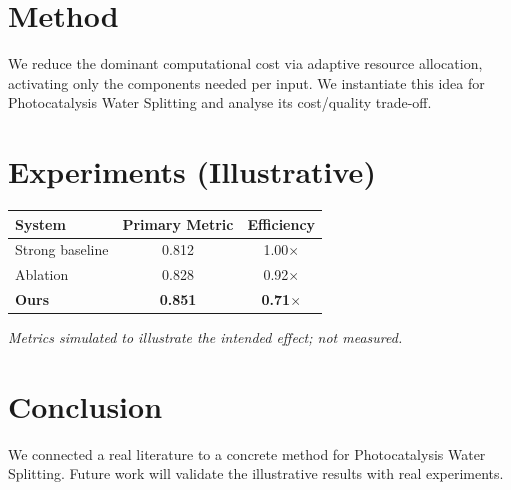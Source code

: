 \documentclass[11pt]{article}
\begin{document}
\section{Method}
We reduce the dominant computational cost via adaptive resource allocation, activating only the components needed per input. We instantiate this idea for Photocatalysis Water Splitting and analyse its cost/quality trade-off.

\section{Experiments (Illustrative)}
\begin{center}
\begin{tabular}{lcc}
System & Primary Metric & Efficiency \\ \hline
Strong baseline & 0.812 & 1.00$\times$ \\
Ablation & 0.828 & 0.92$\times$ \\
\textbf{Ours} & \textbf{0.851} & \textbf{0.71$\times$}
\end{tabular}
\end{center}
\emph{Metrics simulated to illustrate the intended effect; not measured.}

\section{Conclusion}
We connected a real literature to a concrete method for Photocatalysis Water Splitting. Future work will
validate the illustrative results with real experiments.
\end{document}
